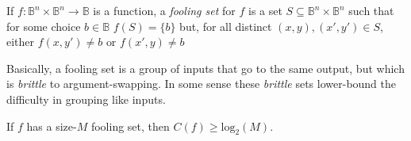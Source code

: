 \begin{definition}
If $f : \mathbb{B}^n \times \mathbb{B}^n \to \mathbb{B}$ is a function,
	a \emph{fooling set} for $f$ is a set
	\(S \subseteq \mathbb{B}^n \times \mathbb{B}^n\)
	such that for some choice $b \in \mathbb{B}$
\(f(S) = \{ b \}\)
but, for all distinct $(x, y), (x', y') \in S$,
either $f(x, y') \neq b \text{ or } f(x', y) \neq b$
\end{definition}
Basically, a fooling set is a group of inputs that go to the same output,
but which is \emph{brittle} to argument-swapping.
In some sense these \emph{brittle} sets lower-bound the difficulty in grouping like inputs.
\pause
\begin{lemma}
If $f$ has a size-$M$ fooling set, then $C(f) \geq \text{log}_2(M)$.
\end{lemma}